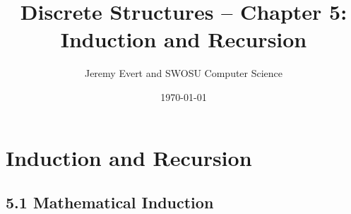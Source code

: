 \documentclass[12pt]{book}
\title{Discrete Structures – Chapter 5: Induction and Recursion}
\author{Jeremy Evert and SWOSU Computer Science}
\date{\today}
\begin{document}
\maketitle
\tableofcontents
\newpage

\chapter{Induction and Recursion}

\section*{5.1 Mathematical Induction}







\end{document}

